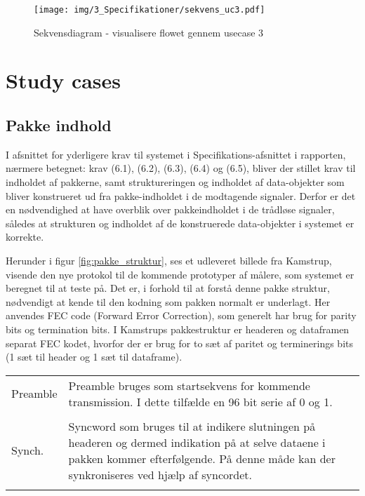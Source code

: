 \begin{appendices}
\begin{figure}[H]
	\centering
	\texttt{[image: img/3\_Specifikationer/sekvens\_uc3.pdf]}
	\caption[Sekvensdiagram usecase 3]{Sekvensdiagram - visualisere flowet gennem usecase 3}
	\label{fig:sekvens_diagram_uc3}
\end{figure}

\chapter{Study cases} \label{appendix::studycases}

\section{Pakke indhold} \label{appendix::studycase::pakke_indhold}
I afsnittet for yderligere krav til systemet i Specifikations-afsnittet i rapporten, nærmere betegnet: krav (6.1), (6.2), (6.3), (6.4) og (6.5), bliver der stillet krav til indholdet af pakkerne, samt struktureringen og indholdet af data-objekter som bliver konstrueret ud fra pakke-indholdet i de modtagende signaler. Derfor er det en nødvendighed at have overblik over pakkeindholdet i de trådløse signaler, således at strukturen og indholdet af de konstruerede data-objekter i systemet er korrekte. 

Herunder i figur \ref{fig:pakke_struktur}, ses et udleveret billede fra Kamstrup, visende den nye protokol til de kommende prototyper af målere, som systemet er beregnet til at teste på. Det er, i forhold til at forstå denne pakke struktur, nødvendigt at kende til den kodning som pakken normalt er underlagt. Her anvendes FEC code (Forward Error Correction), som generelt har brug for parity bits og termination bits. I Kamstrups pakkestruktur er headeren og dataframen separat FEC kodet, hvorfor der er brug for to sæt af paritet og terminerings bits (1 sæt til header og 1 sæt til dataframe).  

\begin{tabular}{ p{3cm} | p{9cm} }
	Preamble & Preamble bruges som startsekvens for kommende transmission. I dette tilfælde en 96 bit serie af 0 og 1.  \\ \\

	Synch. & Syncword som bruges til at indikere slutningen på headeren og dermed indikation på at selve dataene i pakken kommer efterfølgende. På denne måde kan der synkroniseres ved hjælp af syncordet. \\ \\
	

\end{tabular}
\end{appendices}
